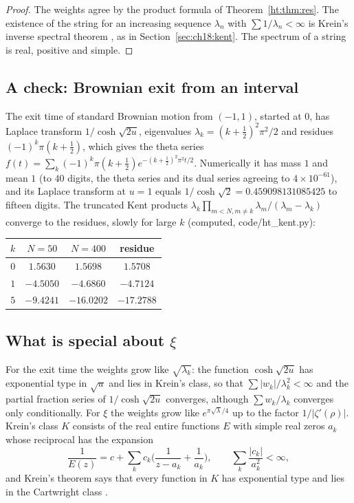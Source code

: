 \begin{proof}
The weights agree by the product formula of Theorem~\ref{ht:thm:res}. The existence of the string for an increasing sequence $\lambda_n$ with $\sum1/\lambda_n<\infty$ is Krein's inverse spectral theorem \cite{DymMcKean76}, as in Section~\ref{sec:ch18:kent}. The spectrum of a string is real, positive and simple.
\end{proof}

\subsection{A check: Brownian exit from an interval}

The exit time of standard Brownian motion from $(-1,1)$, started at $0$, has Laplace transform $1/\cosh\sqrt{2u}$, eigenvalues $\lambda_k=(k+\frac12)^2\pi^2/2$ and residues $(-1)^k\pi(k+\frac12)$, which gives the theta series $f(t)=\sum_k(-1)^k\pi(k+\frac12)e^{-(k+\frac12)^2\pi^2t/2}$. Numerically it has mass $1$ and mean $1$ (to $40$ digits, the theta series and its dual series agreeing to $4\times10^{-61}$), and its Laplace transform at $u=1$ equals $1/\cosh\sqrt2=0.459098131085425$ to fifteen digits. The truncated Kent products $\lambda_k\prod_{m<N,m\ne k}\lambda_m/(\lambda_m-\lambda_k)$ converge to the residues, slowly for large $k$ (computed, code/ht\_kent.py):

\begin{center}
\begin{tabular}{cccc}
\toprule
$k$ & $N=50$ & $N=400$ & residue\\
\midrule
$0$ & $1.5630$ & $1.5698$ & $1.5708$\\
$1$ & $-4.5050$ & $-4.6860$ & $-4.7124$\\
$5$ & $-9.4241$ & $-16.0202$ & $-17.2788$\\
\bottomrule
\end{tabular}
\end{center}

\subsection{What is special about $\xi$}

For the exit time the weights grow like $\sqrt{\lambda_k}$: the function $\cosh\sqrt{2u}$ has exponential type in $\sqrt u$ and lies in Krein's class, so that $\sum|w_k|/\lambda_k^2<\infty$ and the partial fraction series of $1/\cosh\sqrt{2u}$ converges, although $\sum w_k/\lambda_k$ converges only conditionally. For $\xi$ the weights grow like $e^{\pi\sqrt\lambda/4}$ up to the factor $1/|\zeta'(\rho)|$. Krein's class $K$ consists of the real entire functions $E$ with simple real zeros $a_k$ whose reciprocal has the expansion
\[
\frac1{E(z)}=c+\sum_kc_k\Big(\frac1{z-a_k}+\frac1{a_k}\Big),\qquad\sum_k\frac{|c_k|}{a_k^2}<\infty,
\]
and Krein's theorem says that every function in $K$ has exponential type and lies in the Cartwright class \cite{Levin96}. %

